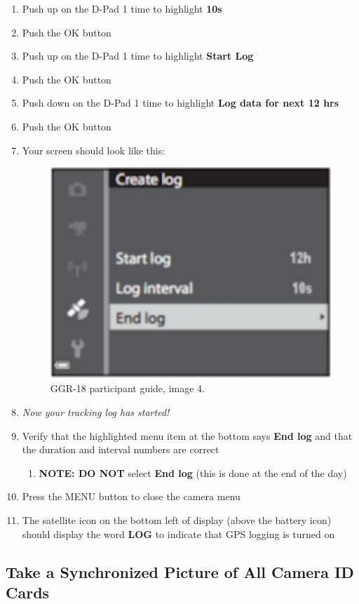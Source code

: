 \begin{enumerate}
    \item Push up on the D-Pad 1 time to highlight \textbf{10s}
    \item Push the OK button
    \item Push up on the D-Pad 1 time to highlight \textbf{Start Log}
    \item Push the OK button
    \item Push down on the D-Pad 1 time to highlight \textbf{Log data for next 12 hrs}
    \item Push the OK button
    \item Your screen should look like this:

          \begin{figure}[H]
              \begin{center}
                  \includegraphics[width=0.4\linewidth]{resources/guide5.pdf}
              \end{center}
              \caption{GGR-18 participant guide, image 4.}
          \end{figure}

    \item \textit{Now your tracking log has started!}
    \item Verify that the highlighted menu item at the bottom says \textbf{End log} and that the duration and interval numbers are correct
          \begin{enumerate}
              \item \textbf{NOTE: DO NOT} select \textbf{End log} (this is done at the end of the day)
          \end{enumerate}
    \item Press the MENU button to close the camera menu
    \item The satellite icon on the bottom left of display (above the battery icon) should display the word \textbf{LOG} to indicate that GPS logging is turned on
\end{enumerate}

\subsection{Take a Synchronized Picture of All Camera ID Cards}

